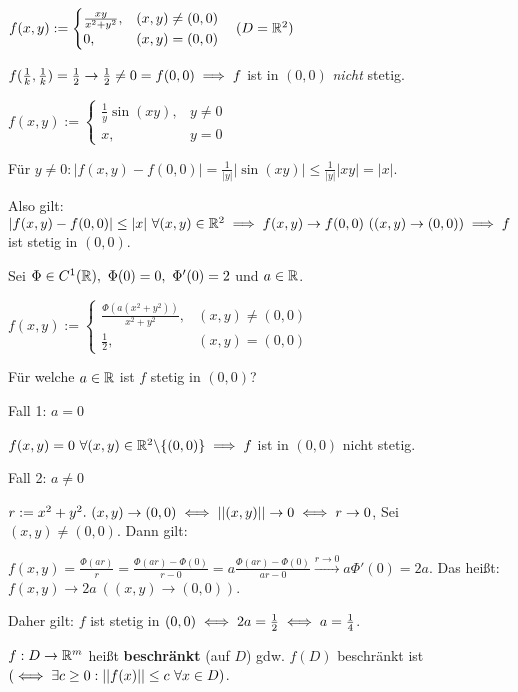 \documentclass[a4paper,twoside,DIV15,BCOR12mm,chapterprefix=true,headings=twolinechapter]{scrbook}
\begin{document}
\begin{beispiele}
\item $f(x,y) := \begin{cases}
\frac{xy}{x^2+y^2}, & (x,y) \ne (0,0)\\
0,                  & (x,y) = (0,0)
\end{cases}\quad(D = \mathbb{R}^2)$

$f(\frac{1}{k},\frac{1}{k}) = \frac{1}{2} \to \frac{1}{2} \ne 0 = f(0,0) \implies f$ ist in $(0,0)$ \emph{nicht} stetig.

\item $f(x,y) := \begin{cases}
\frac{1}{y} \sin(xy), & y \ne 0\\
x,                    & y = 0
\end{cases}$

Für $y \ne 0: |f(x,y) - f(0,0)| = \frac{1}{|y|}|\sin(xy)| \le \frac{1}{|y|}|xy| = |x|.$

Also gilt: $|f(x,y) - f(0,0)| \le |x|\ \forall (x,y) \in \MdR^2 \folgt f(x,y) \to f(0,0)\ ((x,y) \to (0,0)) \folgt f$ ist stetig in $(0,0)$.

\item Sei $\Phi \in C^1(\MdR),\ \Phi(0) = 0,\ \Phi'(0) = 2$ und $a \in \mathbb{R}$.

$f(x,y) := \begin{cases}
\frac{\Phi(a(x^2+y^2))}{x^2+y^2}, & (x,y) \ne (0,0)\\
\frac{1}{2},                      & (x,y) = (0,0)
\end{cases}$

Für welche $a \in \mathbb{R}$ ist $f$ stetig in $(0,0)$?

Fall 1: $a = 0$

$f(x,y) = 0\ \forall(x,y) \in \mathbb{R}^2\backslash\{(0,0)\} \implies f$ ist in $(0,0)$ nicht stetig.

Fall 2: $a \ne 0$

$r := x^2 + y^2.\ (x,y) \to (0,0) \iff ||(x,y)|| \to 0 \iff r \to 0$, Sei $(x,y) \ne (0,0)$. Dann gilt:

$f(x,y) = \frac{\Phi(ar)}{r} = \frac{\Phi(ar) - \Phi(0)}{r - 0} = a \frac{\Phi(ar) - \Phi(0)}{ar - 0} \overset{r \to 0}{\to} a \Phi'(0) = 2a$. Das heißt: $f(x,y) \to 2a\ ((x,y)\to(0,0))$.

Daher gilt: $f$ ist stetig in $(0,0) \iff 2a = \frac{1}{2} \iff a = \frac{1}{4}$.
\end{beispiele}

\begin{definition*}
$f:D \to \mathbb{R}^m$ heißt \textbf{beschränkt} (auf $D$) gdw. $f(D)$ beschränkt ist $(\iff \exists c \ge 0: ||f(x)|| \le c\ \forall x \in D)$.
\end{definition*}
\end{document}
